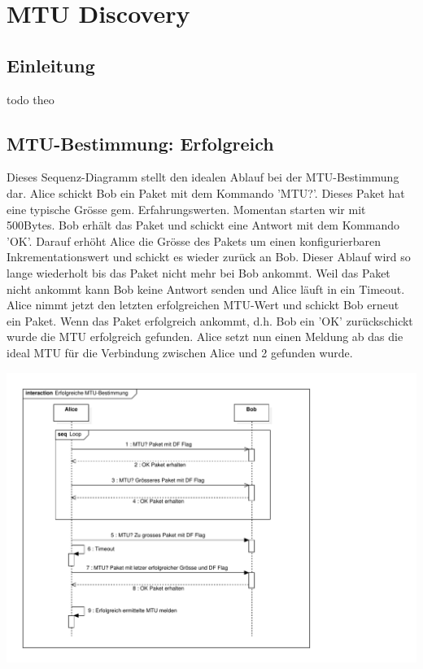 \section{MTU Discovery}
\label{sec:MTU Discovery}

\subsection{Einleitung}
todo theo

\subsection{MTU-Bestimmung: Erfolgreich}
Dieses Sequenz-Diagramm stellt den idealen Ablauf bei der MTU-Bestimmung dar. Alice schickt Bob ein Paket mit dem Kommando 'MTU?'. Dieses Paket hat eine typische Grösse gem. Erfahrungswerten. Momentan starten wir mit 500Bytes. %
Bob erhält das Paket und schickt eine Antwort mit dem Kommando 'OK'. Darauf erhöht Alice
die Grösse des Pakets um einen konfigurierbaren Inkrementationswert und schickt es wieder zurück an
Bob. Dieser Ablauf wird so lange wiederholt bis das Paket nicht mehr bei Bob ankommt.
Weil das Paket nicht ankommt kann Bob keine Antwort senden und Alice läuft in ein Timeout.
Alice nimmt jetzt den letzten erfolgreichen MTU-Wert und schickt Bob erneut ein Paket.
Wenn das Paket erfolgreich ankommt, d.h. Bob ein 'OK' zurückschickt wurde die MTU erfolgreich gefunden. Alice setzt nun einen Meldung ab das die ideal MTU für die Verbindung zwischen Alice und 2 gefunden wurde.

\includegraphics[trim=10 10 200 10,clip,width=\textwidth]{mainpart/implementation/img/MTUBestimmungErfolgreich}

